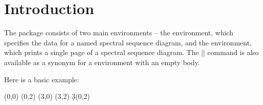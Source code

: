 \restoregeometry
{}
\newpage
\thispagestyle{empty} %
\tableofcontents
\newpage
\section{Introduction}
The \sseqpages\space package consists of two main environments -- the \sseqdataenv\space environment, which specifies the data for a named spectral sequence diagram, and the \sseqpageenv\space environment, which prints a single page of a spectral sequence diagram. The |\printpage| command is also available as a synonym for a \sseqpageenv\space environment with an empty body.

Here is a basic example:
\begin{codeexample}[width = 9cm]
\begin{sseqdata}[ name = ex1, scale = 0.6,
                  cohomological Serre grading ]
\class(0,0)
\class(0,2)
\class(3,0)
\class(3,2)
\d3(0,2)
\end{sseqdata}
\printpage[ name = ex1, page = 3 ]  \quad
\printpage[ name = ex1, page = 4 ]
\end{codeexample}
